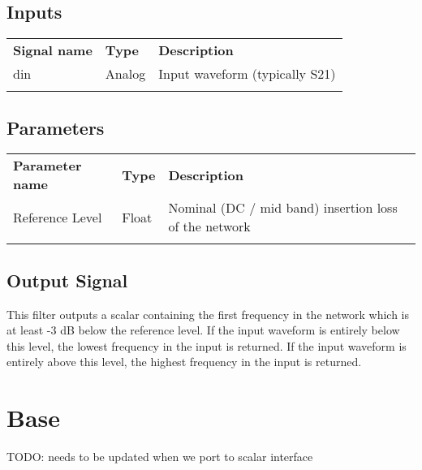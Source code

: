 
\subsection{Inputs}

\begin{tabularx}{16cm}{llX}
\thickhline
\textbf{Signal name} & \textbf{Type} & \textbf{Description} \\
\thickhline
din & Analog & Input waveform (typically S21) \\
\thickhline
\end{tabularx}

\subsection{Parameters}

\begin{tabularx}{16cm}{llX}
\thickhline
\textbf{Parameter name} & \textbf{Type} & \textbf{Description} \\
\thickhline
Reference Level & Float & Nominal (DC / mid band) insertion loss of the network\\
\thickhline
\end{tabularx}

\subsection{Output Signal}

This filter outputs a scalar containing the first frequency in the network which is at least -3 dB below the reference
level. If the input waveform is entirely below this level, the lowest frequency in the input is returned. If the
input waveform is entirely above this level, the highest frequency in the input is returned.

\pagebreak
\section{Base}
\label{filter:base}

TODO: needs to be updated when we port to scalar interface

